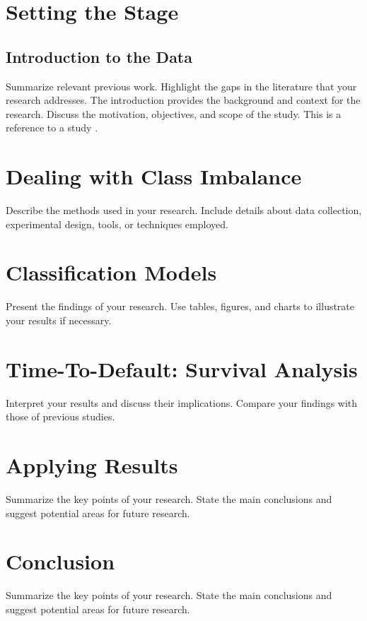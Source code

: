 \documentclass[12pt]{article}
\begin{document}
\section{Setting the Stage}
\subsection{Introduction to the Data}
Summarize relevant previous work. Highlight the gaps in the literature that your research addresses.
The introduction provides the background and context for the research. Discuss the motivation, objectives, and scope of the study.
This is a reference to a study \cite{website2023}.

\section{Dealing with Class Imbalance}
Describe the methods used in your research. Include details about data collection, experimental design, tools, or techniques employed.

\section{Classification Models}
Present the findings of your research. Use tables, figures, and charts to illustrate your results if necessary.

\section{Time-To-Default: Survival Analysis}
Interpret your results and discuss their implications. Compare your findings with those of previous studies.

\section{Applying Results}
Summarize the key points of your research. State the main conclusions and suggest potential areas for future research.

\section{Conclusion}
Summarize the key points of your research. State the main conclusions and suggest potential areas for future research.

\printbibliography
\end{document}
